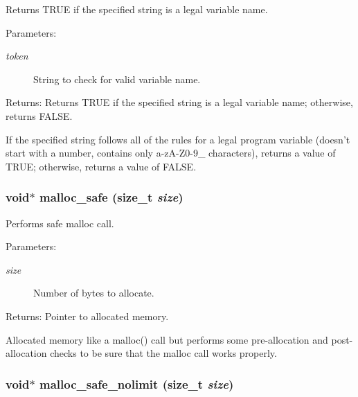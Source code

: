Returns TRUE if the specified string is a legal variable name. 

\begin{Desc}
\item[Parameters:]
\begin{description}
\item[{\em token}]String to check for valid variable name. \end{description}
\end{Desc}
\begin{Desc}
\item[Returns:]Returns TRUE if the specified string is a legal variable name; otherwise, returns FALSE.\end{Desc}
If the specified string follows all of the rules for a legal program variable (doesn't start with a number, contains only a-z\-A-Z0-9\_\- characters), returns a value of TRUE; otherwise, returns a value of FALSE. 
\subsubsection{\setlength{\rightskip}{0pt plus 5cm}void$\ast$ malloc\_\-safe (size\_\-t {\em size})}\label{util_8h_a14}


Performs safe malloc call. 

\begin{Desc}
\item[Parameters:]
\begin{description}
\item[{\em size}]Number of bytes to allocate.\end{description}
\end{Desc}
\begin{Desc}
\item[Returns:]Pointer to allocated memory.\end{Desc}
Allocated memory like a malloc() call but performs some pre-allocation and post-allocation checks to be sure that the malloc call works properly. 
\subsubsection{\setlength{\rightskip}{0pt plus 5cm}void$\ast$ malloc\_\-safe\_\-nolimit (size\_\-t {\em size})}\label{util_8h_a15}


